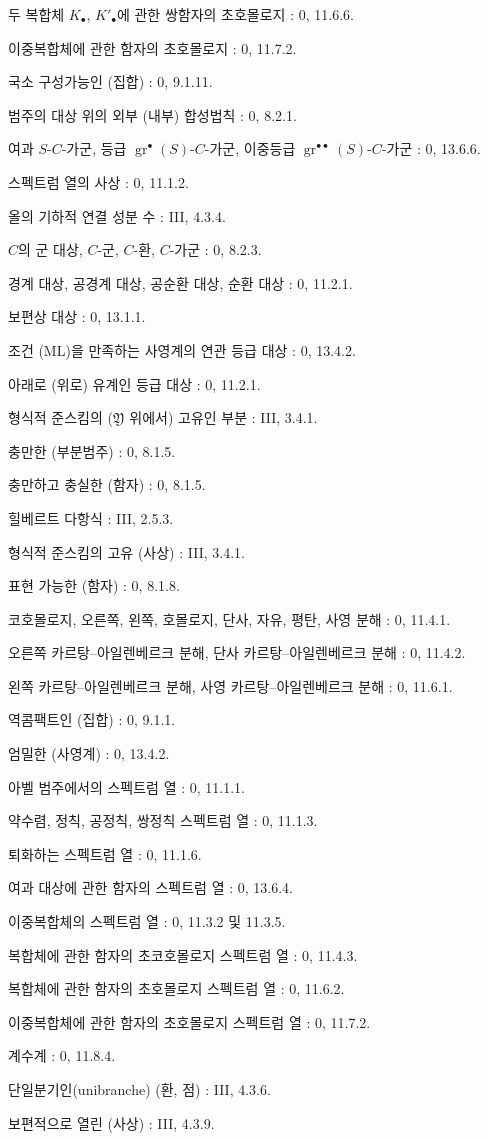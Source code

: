 \begin{flushleft}
두 복합체 $K_\bullet$, $K'_\bullet$에 관한 쌍함자의 초호몰로지 :
0, 11.6.6.

이중복합체에 관한 함자의 초호몰로지 : 0, 11.7.2.

국소 구성가능인 (집합) : 0, 9.1.11.

범주의 대상 위의 외부 (내부) 합성법칙 : 0, 8.2.1.


여과 $S$-$C$-가군, 등급 $\operatorname{gr}^\bullet(S)$-$C$-가군,
이중등급 $\operatorname{gr}^{\bullet\bullet}(S)$-$C$-가군 : 0, 13.6.6.

스펙트럼 열의 사상 : 0, 11.1.2.

올의 기하적 연결 성분 수 : III, 4.3.4.

$C$의 군 대상, $C$-군, $C$-환, $C$-가군 : 0, 8.2.3.

경계 대상, 공경계 대상, 공순환 대상, 순환 대상 : 0, 11.2.1.

보편상 대상 : 0, 13.1.1.

조건 (ML)을 만족하는 사영계의 연관 등급 대상 : 0, 13.4.2.

아래로 (위로) 유계인 등급 대상 : 0, 11.2.1.

형식적 준스킴의 ($\mathfrak Y$ 위에서) 고유인 부분 : III, 3.4.1.

충만한 (부분범주) : 0, 8.1.5.

충만하고 충실한 (함자) : 0, 8.1.5.

힐베르트 다항식 : III, 2.5.3.

형식적 준스킴의 고유 (사상) : III, 3.4.1.

표현 가능한 (함자) : 0, 8.1.8.

코호몰로지, 오른쪽, 왼쪽, 호몰로지, 단사, 자유, 평탄, 사영 분해 :
0, 11.4.1.

오른쪽 카르탕--아일렌베르크 분해, 단사 카르탕--아일렌베르크 분해 :
0, 11.4.2.

왼쪽 카르탕--아일렌베르크 분해, 사영 카르탕--아일렌베르크 분해 :
0, 11.6.1.

역콤팩트인 (집합) : 0, 9.1.1.

엄밀한 (사영계) : 0, 13.4.2.

아벨 범주에서의 스펙트럼 열 : 0, 11.1.1.

약수렴, 정칙, 공정칙, 쌍정칙 스펙트럼 열 : 0, 11.1.3.

퇴화하는 스펙트럼 열 : 0, 11.1.6.

여과 대상에 관한 함자의 스펙트럼 열 : 0, 13.6.4.

이중복합체의 스펙트럼 열 : 0, 11.3.2 및 11.3.5.

복합체에 관한 함자의 초코호몰로지 스펙트럼 열 : 0, 11.4.3.

복합체에 관한 함자의 초호몰로지 스펙트럼 열 : 0, 11.6.2.

이중복합체에 관한 함자의 초호몰로지 스펙트럼 열 : 0, 11.7.2.

계수계 : 0, 11.8.4.

단일분기인(unibranche) (환, 점) : III, 4.3.6.

보편적으로 열린 (사상) : III, 4.3.9.
\end{flushleft}

